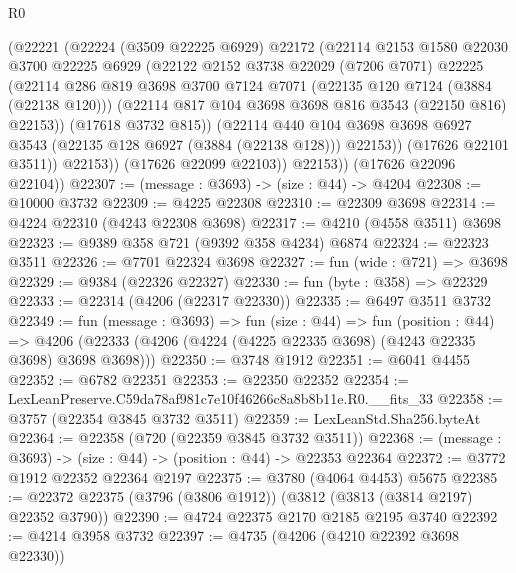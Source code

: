 \begin{lexlean}{R0}
\begin{coremodule}
              (@22221
                (@22224
                  (@3509 @22225 @6929)
                  @22172
                  (@22114
                    @2153
                    @1580
                    @22030
                    @3700
                    @22225
                    @6929
                    (@22122
                      @2152
                      @3738
                      @22029
                      (@7206 @7071)
                      @22225
                      (@22114
                        @286
                        @819
                        @3698
                        @3700
                        @7124
                        @7071
                        (@22135 @120 @7124 (@3884 (@22138 @120)))
                        (@22114 @817 @104 @3698 @3698 @816 @3543 (@22150 @816) @22153))
                      (@17618 @3732 @815))
                    (@22114
                      @440
                      @104
                      @3698
                      @3698
                      @6927
                      @3543
                      (@22135 @128 @6927 (@3884 (@22138 @128)))
                      @22153))
                  (@17626 @22101 @3511))
                @22153))
            (@17626 @22099 @22103))
          @22153))
      (@17626 @22096 @22104))
@22307 := (message : @3693) -> (size : @44) -> @4204
@22308 := @10000 @3732
@22309 := @4225 @22308
@22310 := @22309 @3698
@22314 := @4224 @22310 (@4243 @22308 @3698)
@22317 := @4210 (@4558 @3511) @3698
@22323 := @9389 @358 @721 (@9392 @358 @4234) @6874
@22324 := @22323 @3511
@22326 := @7701 @22324 @3698
@22327 := fun (wide : @721) => @3698
@22329 := @9384 (@22326 @22327)
@22330 := fun (byte : @358) => @22329
@22333 := @22314 (@4206 (@22317 @22330))
@22335 := @6497 @3511 @3732
@22349 := fun (message : @3693) =>
  fun (size : @44) =>
  fun (position : @44) =>
  @4206 (@22333 (@4206 (@4224 (@4225 @22335 @3698) (@4243 @22335 @3698) @3698 @3698)))
@22350 := @3748 @1912
@22351 := @6041 @4455
@22352 := @6782 @22351
@22353 := @22350 @22352
@22354 := LexLeanPreserve.C59da78af981c7e10f46266c8a8b8b11e.R0.__fits_33
@22358 := @3757 (@22354 @3845 @3732 @3511)
@22359 := LexLeanStd.Sha256.byteAt
@22364 := @22358 (@720 (@22359 @3845 @3732 @3511))
@22368 := (message : @3693) -> (size : @44) -> (position : @44) -> @22353 @22364
@22372 := @3772 @1912 @22352 @22364 @2197
@22375 := @3780 (@4064 @4453) @5675
@22385 := @22372 @22375 (@3796 (@3806 @1912)) (@3812 (@3813 (@3814 @2197) @22352 @3790))
@22390 := @4724 @22375 @2170 @2185 @2195 @3740
@22392 := @4214 @3958 @3732
@22397 := @4735 (@4206 (@4210 @22392 @3698 @22330))

\end{coremodule}
\end{lexlean}
